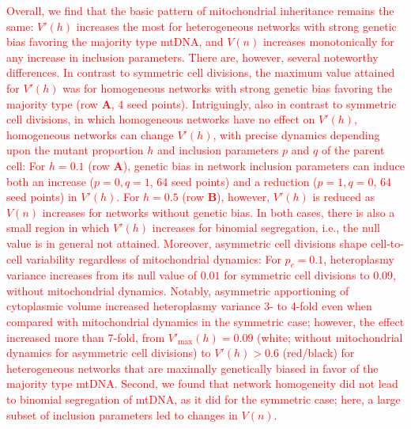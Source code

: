 \documentclass{article}
\begin{document}
\textcolor{red}{Overall, we find that the basic pattern of mitochondrial inheritance remains the same: $V'(h)$ increases the most for heterogeneous networks with strong genetic bias favoring the majority type mtDNA, and $V(n)$ increases monotonically for any increase in inclusion parameters. There are, however, several noteworthy differences. In contrast to symmetric cell divisions, the maximum value attained for $V'(h)$ was for homogeneous networks with strong genetic bias favoring the majority type (row \textbf{A}, 4 seed points). Intriguingly, also in contrast to symmetric cell divisions, in which homogeneous networks have no effect on $V'(h)$, homogeneous networks can change $V'(h)$, with precise dynamics depending upon the mutant proportion $h$ and inclusion parameters $p$ and $q$ of the parent cell: For $h=0.1$ (row \textbf{A}), genetic bias in network inclusion parameters can induce both an increase ($p=0,q=1$, 64 seed points) and a reduction ($p=1,q=0$, 64 seed points) in $V'(h)$. For $h=0.5$ (row \textbf{B}), however, $V'(h)$ is reduced as $V(n)$ increases for networks without genetic bias. In both cases, there is also a small region in which $V'(h)$ increases for binomial segregation, i.e., the null value is in general not attained.
Moreover, asymmetric cell divisions shape cell-to-cell variability regardless of mitochondrial dynamics: For $p_c=0.1$, heteroplasmy variance increases from its null value of $0.01$ for symmetric cell divisions to $0.09$, without mitochondrial dynamics. Notably, asymmetric apportioning of cytoplasmic volume increased heteroplasmy variance 3- to 4-fold even when compared with mitochondrial dynamics in the symmetric case; however, the effect increased more than 7-fold, from $V'_{\max}(h)=0.09$ (white; without mitochondrial dynamics for asymmetric cell divisions) to $V'(h)>0.6$ (red/black) for heterogeneous networks that are maximally genetically biased in favor of the majority type mtDNA. Second, we found that network homogeneity did not lead to binomial segregation of mtDNA, as it did for the symmetric case; here, a large subset of inclusion parameters led to changes in $V(n)$.}
\end{document}
